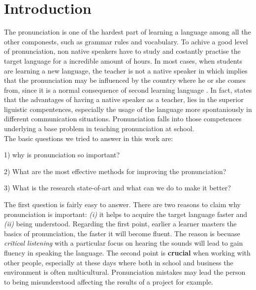 \chapter{Introduction}
The pronunciation is one of the hardest part of learning a language among all the other componests, such as grammar rules and vocabulary. To achive a good level of pronunciation, non native speakers have to study and costantly practise the target language for a incredible amount of hours. In most cases, when students are learning a new language, the teacher is not a native speaker in which implies that the pronunciation may be influenced by the country where he or she comes from, since it is a normal consequence of second learning language \cite{derwing2005second}. In fact, \cite{medgyes2001teacher} states that the advantages of having a native speaker as a teacher, lies in the superior liguistic compentences, especially the usage of the language more spontaniously in different communication situations. Pronunciation falls into those competences underlying a base problem in teaching pronunciation at school.  \\

\noindent The basic questions we tried to answer in this work are:
\begin{compactitem}
    \item[1)] why is pronunciation so important?
    \item[2)] What are the most effective methods for improving the pronunciation?
    \item[3)] What is the research state-of-art and what can we do to make it better?
\end{compactitem}

\vspace*{1em}

\noindent The first question is fairly easy to answer. There are two reasons to claim why pronunciation is important: \textit{(i)} it helps to acquire the target language faster and \textit{(ii)} being understood.
Regarding the first point, earlier a learner masters the basics of pronunciation, the faster it will become fluent. The reason is becuase \textit{critical listening} with a particular focus on hearing the sounds will lead to gain fluency in speaking the language.
The second point is \textbf{crucial} when working with other people, especially at these days where both in school and business the environment is often multicultural. Pronunciation mistakes may lead the person to being misunderstood affecting the results of a project for example. \\

